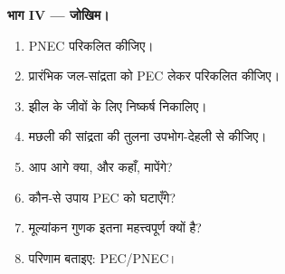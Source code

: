 \begin{problem}
\medskip\noindent\textbf{भाग IV --- जोखिम।}
\begin{enumerate}[resume]
  \item PNEC परिकलित कीजिए।
  \item प्रारंभिक जल-सांद्रता को PEC लेकर  परिकलित कीजिए।
  \item झील के जीवों के लिए निष्कर्ष निकालिए।
  \item मछली की सांद्रता की तुलना उपभोग-देहली से कीजिए।
  \item आप आगे क्या, और कहाँ, मापेंगे?
  \item कौन-से उपाय PEC को घटाएँगे?
  \item मूल्यांकन गुणक इतना महत्त्वपूर्ण क्यों है?
  \item परिणाम बताइए:  PEC/PNEC।
\end{enumerate}
\end{problem}
